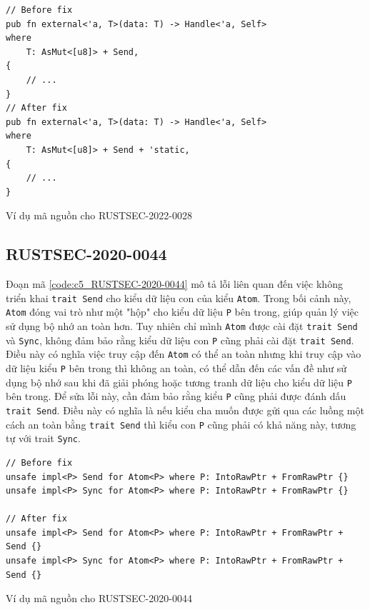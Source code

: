 
\begin{listing}[H]
\begin{verbatim}
// Before fix
pub fn external<'a, T>(data: T) -> Handle<'a, Self>
where
    T: AsMut<[u8]> + Send,
{
    // ...
}
// After fix
pub fn external<'a, T>(data: T) -> Handle<'a, Self>
where
    T: AsMut<[u8]> + Send + 'static,
{
    // ...
}
\end{verbatim}
\caption{Ví dụ mã nguồn cho RUSTSEC-2022-0028}
\label{code:c5_RUSTSEC-2022-0028}
\end{listing}



\subsection{RUSTSEC-2020-0044}

Đoạn mã \ref{code:c5_RUSTSEC-2020-0044} mô tả lỗi liên quan đến việc không triển khai \texttt{trait Send} cho kiểu dữ liệu con của kiểu \texttt{Atom}.
Trong bối cảnh này, \texttt{Atom} đóng vai trò như một "hộp" cho kiểu dữ liệu \texttt{P} bên trong, giúp quản lý việc sử dụng bộ nhớ an toàn hơn.
Tuy nhiên chỉ mình \texttt{Atom} được cài đặt \texttt{trait Send} và \texttt{Sync}, không đảm bảo rằng kiểu dữ liệu con \texttt{P} cũng phải cài đặt \texttt{trait Send}.
Điều này có nghĩa việc truy cập đến \texttt{Atom} có thể an toàn nhưng khi truy cập vào dữ liệu kiểu \texttt{P} bên trong thì không an toàn, có thể dẫn đến các vấn đề như sử dụng bộ nhớ sau khi đã giải phóng hoặc tương tranh dữ liệu cho kiểu dữ liệu \texttt{P} bên trong.
Để sửa lỗi này, cần đảm bảo rằng kiểu \texttt{P} cũng phải được đánh dấu \texttt{trait Send}.
Điều này có nghĩa là nếu kiểu cha muốn được gửi qua các luồng một cách an toàn bằng \texttt{trait Send} thì kiểu con \texttt{P} cũng phải có khả năng này, tương tự với trait \texttt{Sync}.

\begin{listing}[H]
\begin{verbatim}
// Before fix
unsafe impl<P> Send for Atom<P> where P: IntoRawPtr + FromRawPtr {}
unsafe impl<P> Sync for Atom<P> where P: IntoRawPtr + FromRawPtr {}

// After fix
unsafe impl<P> Send for Atom<P> where P: IntoRawPtr + FromRawPtr + Send {}
unsafe impl<P> Sync for Atom<P> where P: IntoRawPtr + FromRawPtr + Send {}
\end{verbatim}
\caption{Ví dụ mã nguồn cho RUSTSEC-2020-0044}
\label{code:c5_RUSTSEC-2020-0044}
\end{listing}

